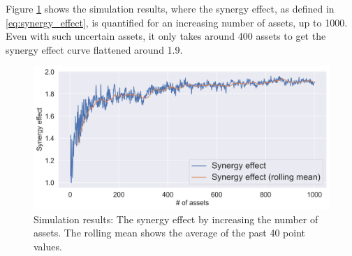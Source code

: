 \documentclass[conference]{IEEEtran}
\begin{document}

Figure \ref{fig:synergy_effect} shows the simulation results, where the synergy effect, as defined in \eqref{eq:synergy_effect}, is quantified for an increasing number of assets, up to 1000. Even with such uncertain assets, it only takes around 400 assets to get the synergy effect curve flattened around 1.9.


\begin{figure}[b]
    \centering
    \includegraphics[width=\columnwidth]{figures/synergy_effect.png}
    \caption{Simulation results: The synergy effect by increasing the number of assets. The rolling mean shows the average of the past 40 point values.}
    \label{fig:synergy_effect}
\end{figure}

\end{document}
